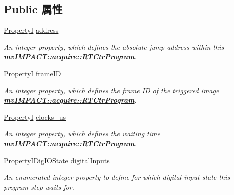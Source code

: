 \subsection*{Public 属性}
\begin{DoxyCompactItemize}
\item 
\hyperlink{group___common_interface_ga12d5e434238ca242a1ba4c6c3ea45780}{Property\+I} \hyperlink{classmv_i_m_p_a_c_t_1_1acquire_1_1_r_t_ctr_program_step_a2a9740df9ac629e37f87b67249858f4c}{address}
\begin{DoxyCompactList}\small\item\em An integer property, which defines the absolute jump address within this {\bfseries \hyperlink{classmv_i_m_p_a_c_t_1_1acquire_1_1_r_t_ctr_program}{mv\+I\+M\+P\+A\+C\+T\+::acquire\+::\+R\+T\+Ctr\+Program}}. \end{DoxyCompactList}\item 
\hyperlink{group___common_interface_ga12d5e434238ca242a1ba4c6c3ea45780}{Property\+I} \hyperlink{classmv_i_m_p_a_c_t_1_1acquire_1_1_r_t_ctr_program_step_acaad4a76b9a9805234c1a8a1a7aa0aa3}{frame\+I\+D}
\begin{DoxyCompactList}\small\item\em An integer property, which defines the frame I\+D of the triggered image {\bfseries \hyperlink{classmv_i_m_p_a_c_t_1_1acquire_1_1_r_t_ctr_program}{mv\+I\+M\+P\+A\+C\+T\+::acquire\+::\+R\+T\+Ctr\+Program}}. \end{DoxyCompactList}\item 
\hyperlink{group___common_interface_ga12d5e434238ca242a1ba4c6c3ea45780}{Property\+I} \hyperlink{classmv_i_m_p_a_c_t_1_1acquire_1_1_r_t_ctr_program_step_a3939901a39a4b5b95d3c1b1c5f176458}{clocks\+\_\+us}
\begin{DoxyCompactList}\small\item\em An integer property, which defines the waiting time {\bfseries \hyperlink{classmv_i_m_p_a_c_t_1_1acquire_1_1_r_t_ctr_program}{mv\+I\+M\+P\+A\+C\+T\+::acquire\+::\+R\+T\+Ctr\+Program}}. \end{DoxyCompactList}\item 
\hyperlink{group___device_specific_interface_ga26369d2e6b583ee092988de00a839413}{Property\+I\+Dig\+I\+O\+State} \hyperlink{classmv_i_m_p_a_c_t_1_1acquire_1_1_r_t_ctr_program_step_a15975e93c4803355e9ce1bf5a33786ec}{digital\+Inputs}
\begin{DoxyCompactList}\small\item\em An enumerated integer property to define for which digital input state this program step waits for. \end{DoxyCompactList}\item 

\end{DoxyCompactItemize}
